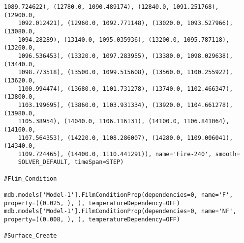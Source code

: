 \documentclass[12pt, letterpaper, oneside]{report}
\begin{document}
\begin{lstlisting}[frame=none]
    1089.724622), (12780.0, 1090.489174), (12840.0, 1091.251768), (12900.0, 
    1092.012421), (12960.0, 1092.771148), (13020.0, 1093.527966), (13080.0, 
    1094.28289), (13140.0, 1095.035936), (13200.0, 1095.787118), (13260.0, 
    1096.536453), (13320.0, 1097.283955), (13380.0, 1098.029638), (13440.0, 
    1098.773518), (13500.0, 1099.515608), (13560.0, 1100.255922), (13620.0, 
    1100.994474), (13680.0, 1101.731278), (13740.0, 1102.466347), (13800.0, 
    1103.199695), (13860.0, 1103.931334), (13920.0, 1104.661278), (13980.0, 
    1105.38954), (14040.0, 1106.116131), (14100.0, 1106.841064), (14160.0, 
    1107.564353), (14220.0, 1108.286007), (14280.0, 1109.006041), (14340.0, 
    1109.724465), (14400.0, 1110.441291)), name='Fire-240', smooth=
    SOLVER_DEFAULT, timeSpan=STEP)

#Flim_Condition

mdb.models['Model-1'].FilmConditionProp(dependencies=0, name='F', property=((0.025, ), ), temperatureDependency=OFF)
mdb.models['Model-1'].FilmConditionProp(dependencies=0, name='NF', property=((0.008, ), ), temperatureDependency=OFF)

#Surface_Create


\end{lstlisting}
\end{document}
